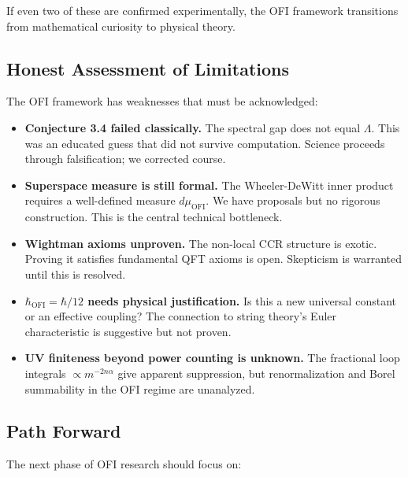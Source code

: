 \documentclass[12pt,a4paper]{article}
\theoremstyle{definition}
\newcommand{\OFI}{\text{OFI}}
\newcommand{\hbarOFI}{\hbar_{\OFI}}
\begin{document}
If even two of these are confirmed experimentally, the OFI framework transitions from mathematical curiosity to physical theory.

\subsection{Honest Assessment of Limitations}

The OFI framework has weaknesses that must be acknowledged:

\begin{itemize}
\item \textbf{Conjecture 3.4 failed classically.} The spectral gap does not equal $\Lambda$. This was an educated guess that did not survive computation. Science proceeds through falsification; we corrected course.

\item \textbf{Superspace measure is still formal.} The Wheeler-DeWitt inner product requires a well-defined measure $d\mu_{\OFI}$. We have proposals but no rigorous construction. This is the central technical bottleneck.

\item \textbf{Wightman axioms unproven.} The non-local CCR structure is exotic. Proving it satisfies fundamental QFT axioms is open. Skepticism is warranted until this is resolved.

\item \textbf{$\hbarOFI = \hbar/12$ needs physical justification.} Is this a new universal constant or an effective coupling? The connection to string theory's Euler characteristic is suggestive but not proven.

\item \textbf{UV finiteness beyond power counting is unknown.} The fractional loop integrals $\propto m^{-2n\alpha}$ give apparent suppression, but renormalization and Borel summability in the OFI regime are unanalyzed.
\end{itemize}

\subsection{Path Forward}

The next phase of OFI research should focus on:
\end{document}

